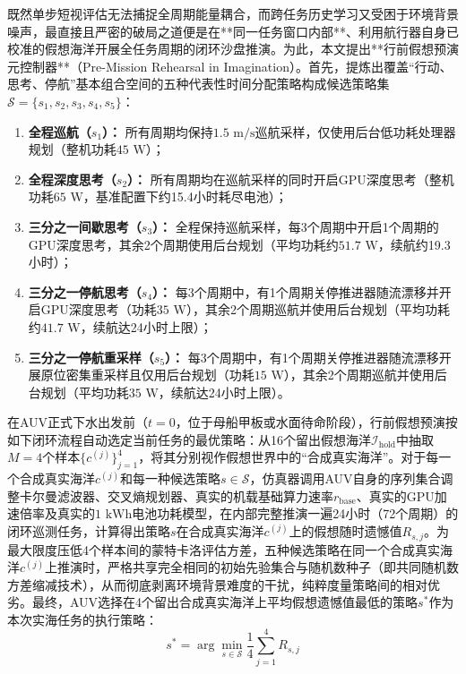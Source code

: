 既然单步短视评估无法捕捉全周期能量耦合，而跨任务历史学习又受困于环境背景噪声，最直接且严密的破局之道便是在**同一任务窗口内部**、利用航行器自身已校准的假想海洋开展全任务周期的闭环沙盘推演。为此，本文提出**行前假想预演元控制器**（Pre-Mission Rehearsal in Imagination）。首先，提炼出覆盖“行动、思考、停航”基本组合空间的五种代表性时间分配策略构成候选策略集$\mathcal{S}=\{s_1, s_2, s_3, s_4, s_5\}$：
\begin{enumerate}
  \item \textbf{全程巡航（$s_1$）：} 所有周期均保持$1.5\text{ m/s}$巡航采样，仅使用后台低功耗处理器规划（整机功耗$45\text{ W}$）；
  \item \textbf{全程深度思考（$s_2$）：} 所有周期均在巡航采样的同时开启GPU深度思考（整机功耗$65\text{ W}$，基准配置下约15.4小时耗尽电池）；
  \item \textbf{三分之一间歇思考（$s_3$）：} 全程保持巡航采样，每3个周期中开启1个周期的GPU深度思考，其余2个周期使用后台规划（平均功耗约$51.7\text{ W}$，续航约19.3小时）；
  \item \textbf{三分之一停航思考（$s_4$）：} 每3个周期中，有1个周期关停推进器随流漂移并开启GPU深度思考（功耗$35\text{ W}$），其余2个周期巡航并使用后台规划（平均功耗约$41.7\text{ W}$，续航达24小时上限）；
  \item \textbf{三分之一停航重采样（$s_5$）：} 每3个周期中，有1个周期关停推进器随流漂移开展原位密集重采样且仅用后台规划（功耗$15\text{ W}$），其余2个周期巡航并使用后台规划（平均功耗$35\text{ W}$，续航达24小时上限）。
\end{enumerate}

在AUV正式下水出发前（$t=0$，位于母船甲板或水面待命阶段），行前假想预演按如下闭环流程自动选定当前任务的最优策略：从16个留出假想海洋$\mathcal{I}_{\text{hold}}$中抽取$M=4$个样本$\{c^{(j)}\}_{j=1}^4$，将其分别视作假想世界中的“合成真实海洋”。对于每一个合成真实海洋$c^{(j)}$和每一种候选策略$s\in\mathcal{S}$，仿真器调用AUV自身的序列集合调整卡尔曼滤波器、交叉熵规划器、真实的机载基础算力速率$r_{\text{base}}$、真实的GPU加速倍率及真实的$1\text{ kWh}$电池功耗模型，在内部完整推演一遍24小时（72个周期）的闭环巡测任务，计算得出策略$s$在合成真实海洋$c^{(j)}$上的假想随时遗憾值$R_{s,j}$。为最大限度压低4个样本间的蒙特卡洛评估方差，五种候选策略在同一个合成真实海洋$c^{(j)}$上推演时，严格共享完全相同的初始先验集合与随机数种子（即共同随机数方差缩减技术），从而彻底剥离环境背景难度的干扰，纯粹度量策略间的相对优劣。最终，AUV选择在4个留出合成真实海洋上平均假想遗憾值最低的策略$s^*$作为本次实海任务的执行策略：
\begin{equation}
  s^* = \arg\min_{s\in\mathcal{S}} \frac{1}{4}\sum_{j=1}^4 R_{s,j}
  \label{eq:rehearsal}
\end{equation}


